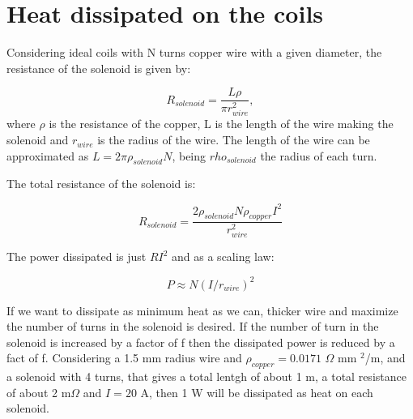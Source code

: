 \documentclass[
10pt, %
a4paper, %
oneside, %
headinclude,footinclude, %
BCOR5mm, %
]{scrartcl}
\begin{document}
\newpage

\section{Heat dissipated on the coils}

Considering ideal coils with N turns copper wire with a given diameter, the resistance of the solenoid is given by:

\begin{equation}
    R_{solenoid} = \frac{L\rho}{\pi r_{wire}^{2}},
\end{equation}
where $\rho$ is the resistance of the copper, L is the length of the wire making the solenoid and $r_{wire}$ is the radius of the wire. The length of the wire can be approximated as $L = 2\pi \rho_{solenoid} N$, being $rho_{solenoid}$ the radius of each turn.

The total resistance of the solenoid is:

\begin{equation}
    R_{solenoid} = \frac{2 \rho_{solenoid} N \rho_{copper} I^{2}}{r_{wire}^{2}}
\end{equation}

The power dissipated is just $RI^{2}$ and as a scaling law:

\begin{equation}
    P \approx N (I / r_{wire})^{2}
\end{equation}

If we want to dissipate as minimum heat as we can, thicker wire and maximize the number of turns in the solenoid is desired. If the number of turn in the solenoid is increased by a factor of f then the dissipated power is reduced by a fact of f. Considering a 1.5 mm radius wire and $\rho_{copper} = 0.0171$ $\Omega$ mm $^{2}$/m, and a solenoid with 4 turns, that gives a total lentgh of about 1 m, a total resistance of about 2 m$\Omega$ and $I = 20$ A, then 1 W will be dissipated as heat on each solenoid.
\end{document}
